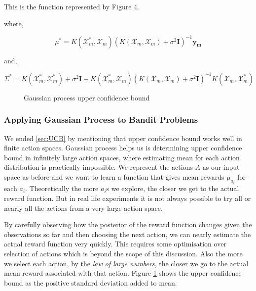 \documentclass[english]{tktltiki}
\begin{document}
This is the function represented by Figure 4.

where,

\begin{equation}
\mu^* = K(\mathcal{X}_m^*, \mathcal{X}_m)(K(\mathcal{X}_m, \mathcal{X}_m) + \sigma^2 \mathbf{I})^{-1}\mathbf{y_m}
\label{gauss_poster_mean}
\end{equation}

and,

\begin{equation}
\Sigma^* = K(\mathcal{X}_m^*, \mathcal{X}_m^*) + \sigma^2 \mathbf{I} - K(\mathcal{X}_m^*, \mathcal{X}_m)(K(\mathcal{X}_m, \mathcal{X}_m) + \sigma^2 \mathbf{I})^{-1} K(\mathcal{X}_m, \mathcal{X}_m^*)
\label{gauss_poster_var}
\end{equation}

\begin{figure}[htb] 
\centering
 
\caption{Gaussian process upper confidence bound}
\label{fig:gp_ucb}
\end{figure}

\subsubsection{Applying Gaussian Process to Bandit Problems}

We ended \ref{sec:UCB} by mentioning that upper confidence bound works well in finite action spaces. Gaussian process helps us is determining upper confidence bound in infinitely large action spaces, where estimating mean for each action distribution is practically impossible. We represent the actions $A$ as our input space as before and we want to learn a function that gives mean rewards $\mu_{a_i}$ for each $a_i$. Theoretically the more $a_i$s we explore, the closer we get to the actual reward function. But in real life experiments it is not always possible to try all or nearly all the actions from a very large action space.





By carefully observing how the posterior of the reward function changes given the observations so far and then choosing the next action, we can nearly estimate the actual reward function very quickly. This requires some optimisation over selection of actions which is beyond the scope of this discussion. Also the more we select each action, by the \textit{law of large numbers}, the closer we go to the actual mean reward associated with that action. Figure \ref{fig:gp_ucb} shows the upper confidence bound as the positive standard deviation added to mean.
\end{document}
